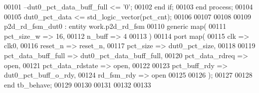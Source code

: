 \begin{DoxyCode}
00101 \textcolor{keyword}{         --dut0\_pct\_data\_buff\_full <= '0';}
00102         \textcolor{keywordflow}{end} \textcolor{keywordflow}{if};
00103     \textcolor{keywordflow}{end} \textcolor{keywordflow}{process};
00104     
00105     \textcolor{vhdlchar}{dut0_pct_data}  \textcolor{vhdlchar}{<=} \textcolor{comment}{std\_logic\_vector}\textcolor{vhdlchar}{(}\textcolor{vhdlchar}{pct_cnt}\textcolor{vhdlchar}{)};
00106    
00107 
00108   
00109   p2d\_rd\_fsm\_dut0 : \textcolor{keywordflow}{entity} work.p2d_rd_fsm
00110    \textcolor{keywordflow}{generic} \textcolor{keywordflow}{map}(
00111       pct_size_w        => \textcolor{vhdllogic}{16},
00112       n_buff            => \textcolor{vhdllogic}{4}
00113    \textcolor{vhdlchar}{)}
00114    \textcolor{keywordflow}{port} \textcolor{keywordflow}{map}(
00115       clk                  => clk0,
00116       reset_n              => reset_n,
00117       pct_size             => dut0_pct_size, 
00118       
00119       pct_data_buff_full   => dut0_pct_data_buff_full,
00120       pct_data_rdreq       => \textcolor{keywordflow}{open},
00121       pct_data_rdstate     => \textcolor{keywordflow}{open},
00122       
00123       pct_buff_rdy         => dut0_pct_buff_o_rdy,
00124       rd_fsm_rdy           => \textcolor{keywordflow}{open}
00125       
00126       \textcolor{vhdlchar}{)};
00127     
00128     \textcolor{keywordflow}{end} \textcolor{vhdlchar}{tb\_behave};
00129   
00130   
00131 
00132 
00133   
\end{DoxyCode}
